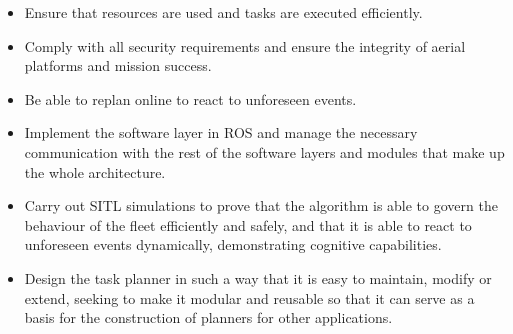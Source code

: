 \begin{itemize}
    \item Ensure that resources are used and tasks are executed efficiently.
    \item Comply with all security requirements and ensure the integrity of aerial platforms and mission success.
    \item Be able to replan online to react to unforeseen events.
    \item Implement the software layer in \gls{ROS} and manage the necessary communication with the rest of the software layers and modules that make up the whole architecture.
    \item Carry out \gls{SITL} simulations to prove that the algorithm is able to govern the behaviour of the fleet efficiently and safely, and that it is able to react to unforeseen events dynamically, demonstrating cognitive capabilities.
    \item Design the task planner in such a way that it is easy to maintain, modify or extend, seeking to make it modular and reusable so that it can serve as a basis for the construction of planners for other applications.
\end{itemize}



\endinput